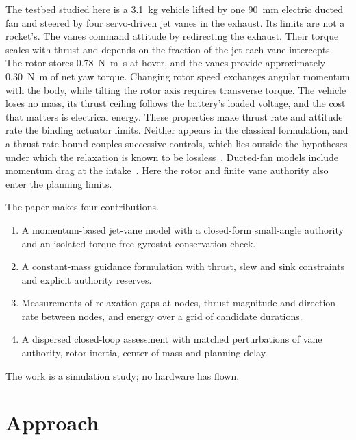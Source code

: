 \documentclass[10pt,letterpaper]{article}
\begin{document}
The testbed studied here is a \SI{3.1}{\kilogram} vehicle lifted by one \SI{90}{\milli\metre} electric ducted fan and steered by four servo-driven jet vanes in the exhaust.
Its limits are not a rocket's.
The vanes command attitude by redirecting the exhaust. Their torque scales with thrust and depends on the fraction of the jet each vane intercepts.
The rotor stores \SI{0.78}{\newton\metre\second} at hover, and the vanes provide approximately \SI{0.30}{\newton\metre} of net yaw torque. Changing rotor speed exchanges angular momentum with the body, while tilting the rotor axis requires transverse torque.
The vehicle loses no mass, its thrust ceiling follows the battery's loaded voltage, and the cost that matters is electrical energy.
These properties make thrust rate and attitude rate the binding actuator limits.
Neither appears in the classical formulation, and a thrust-rate bound couples successive controls, which lies outside the hypotheses under which the relaxation is known to be lossless~\cite{acikmese2011lcvx,harris2014lcvx}.
Ducted-fan models include momentum drag at the intake~\cite{johnson2006ducted}. Here the rotor and finite vane authority also enter the planning limits.

The paper makes four contributions.
\begin{enumerate}
\item A momentum-based jet-vane model with a closed-form small-angle authority and an isolated torque-free gyrostat conservation check.
\item A constant-mass guidance formulation with thrust, slew and sink constraints and explicit authority reserves.
\item Measurements of relaxation gaps at nodes, thrust magnitude and direction rate between nodes, and energy over a grid of candidate durations.
\item A dispersed closed-loop assessment with matched perturbations of vane authority, rotor inertia, center of mass and planning delay.
\end{enumerate}
The work is a simulation study; no hardware has flown.

\section{Approach}
\end{document}
